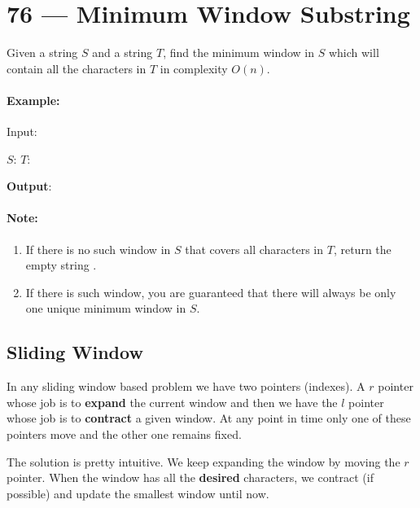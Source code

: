 \section{76 --- Minimum Window Substring}
Given a string $S$ and a string $T$, find the minimum window in $S$ which will contain all the characters in $T$ in complexity $O(n)$.

\paragraph{Example:}

\begin{flushleft}
Input: 

$S$:  
$T$: 

\textbf{Output}: 
\end{flushleft}

\paragraph{Note:}

\begin{enumerate}
\item If there is no such window in $S$ that covers all characters in $T$, return the empty string .
\item If there is such window, you are guaranteed that there will always be only one unique minimum window in $S$.
\end{enumerate}


\subsection{Sliding Window}
In any sliding window based problem we have two pointers (indexes). A $r$ pointer whose job is to \textbf{expand} the current window and then we have the $l$ pointer whose job is to \textbf{contract} a given window. At any point in time only one of these pointers move and the other one remains fixed.

The solution is pretty intuitive. We keep expanding the window by moving the $r$ pointer. When the window has all the \textbf{desired} characters, we contract (if possible) and update the smallest window until now.

